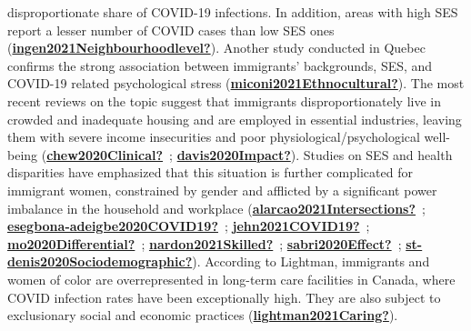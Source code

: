 \documentclass[
]{article}
\begin{document}
disproportionate share of COVID-19 infections. In addition, areas with high SES
report a lesser number of COVID cases than low SES ones
(\protect\hyperlink{ref-ingen2021Neighbourhoodlevel}{\textbf{ingen2021Neighbourhoodlevel?}}). Another study conducted in Quebec confirms the
strong association between immigrants' backgrounds, SES, and COVID-19 related
psychological stress (\protect\hyperlink{ref-miconi2021Ethnocultural}{\textbf{miconi2021Ethnocultural?}}). The most recent reviews on the
topic suggest that immigrants disproportionately live in crowded and inadequate
housing and are employed in essential industries, leaving them with severe
income insecurities and poor physiological/psychological well-being
(\protect\hyperlink{ref-chew2020Clinical}{\textbf{chew2020Clinical?}}~; \protect\hyperlink{ref-davis2020Impact}{\textbf{davis2020Impact?}}). Studies on SES and health disparities
have emphasized that this situation is further complicated for immigrant women,
constrained by gender and afflicted by a significant power imbalance in the
household and workplace (\protect\hyperlink{ref-alarcao2021Intersections}{\textbf{alarcao2021Intersections?}}~; \protect\hyperlink{ref-esegbona-adeigbe2020COVID19}{\textbf{esegbona-adeigbe2020COVID19?}}~; \protect\hyperlink{ref-jehn2021COVID19}{\textbf{jehn2021COVID19?}}~; \protect\hyperlink{ref-mo2020Differential}{\textbf{mo2020Differential?}}~; \protect\hyperlink{ref-nardon2021Skilled}{\textbf{nardon2021Skilled?}}~; \protect\hyperlink{ref-sabri2020Effect}{\textbf{sabri2020Effect?}}~; \protect\hyperlink{ref-st-denis2020Sociodemographic}{\textbf{st-denis2020Sociodemographic?}}). According
to Lightman, immigrants and women of color are overrepresented in long-term care
facilities in Canada, where COVID infection rates have been exceptionally high.
They are also subject to exclusionary social and economic practices
(\protect\hyperlink{ref-lightman2021Caring}{\textbf{lightman2021Caring?}}).
\end{document}
